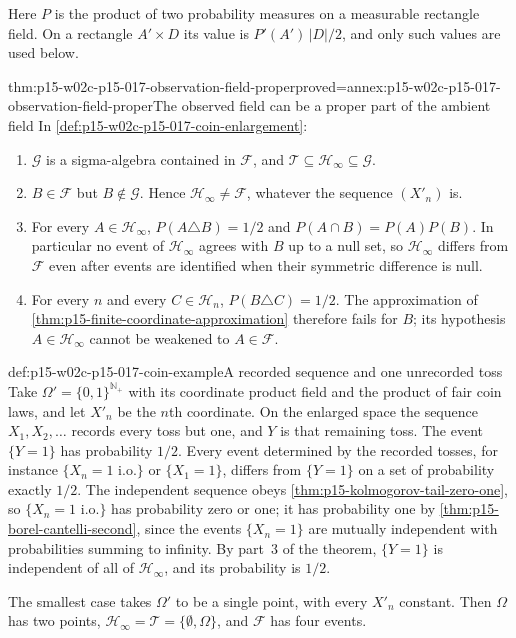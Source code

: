 Here \(P\) is the product of two probability measures on a measurable
rectangle field. On a rectangle \(A'\times D\) its value is
\(P'(A')\,|D|/2\), and only such values are used below.

\begin{hbtheorem}{thm:p15-w02c-p15-017-observation-field-proper}{proved=annex:p15-w02c-p15-017-observation-field-proper}{The observed field can be a proper part of the ambient field}
In \cref{def:p15-w02c-p15-017-coin-enlargement}:
\begin{enumerate}
\item \(\mathcal G\) is a sigma-algebra contained in \(\mathcal F\), and
\(\mathcal T\subseteq\mathcal H_\infty\subseteq\mathcal G\).
\item \(B\in\mathcal F\) but \(B\notin\mathcal G\). Hence
\(\mathcal H_\infty\neq\mathcal F\), whatever the sequence
\((X'_n)\) is.
\item For every \(A\in\mathcal H_\infty\),
\(P(A\triangle B)=1/2\) and \(P(A\cap B)=P(A)P(B)\).
In particular no event of \(\mathcal H_\infty\) agrees with \(B\)
up to a null set, so \(\mathcal H_\infty\) differs from \(\mathcal F\)
even after events are identified when their symmetric difference is null.
\item For every \(n\) and every \(C\in\mathcal H_n\),
\(P(B\triangle C)=1/2\). The approximation of
\cref{thm:p15-finite-coordinate-approximation} therefore fails for
\(B\); its hypothesis \(A\in\mathcal H_\infty\) cannot be weakened to
\(A\in\mathcal F\).
\end{enumerate}
\end{hbtheorem}

\begin{hbexample}{def:p15-w02c-p15-017-coin-example}{A recorded sequence and one unrecorded toss}
Take \(\Omega'=\{0,1\}^{\mathbb N_+}\) with its coordinate product field
and the product of fair coin laws, and let \(X'_n\) be the \(n\)th
coordinate. On the enlarged space the sequence \(X_1,X_2,\ldots\)
records every toss but one, and \(Y\) is that remaining toss. The event
\(\{Y=1\}\) has probability \(1/2\). Every event determined by the
recorded tosses, for instance \(\{X_n=1\text{ i.o.}\}\) or
\(\{X_1=1\}\), differs from \(\{Y=1\}\) on a set of probability exactly
\(1/2\). The independent sequence obeys
\cref{thm:p15-kolmogorov-tail-zero-one}, so \(\{X_n=1\text{ i.o.}\}\)
has probability zero or one; it has probability one by
\cref{thm:p15-borel-cantelli-second}, since the events
\(\{X_n=1\}\) are mutually independent with probabilities summing to
infinity. By part~3 of the theorem, \(\{Y=1\}\) is independent of all
of \(\mathcal H_\infty\), and its probability is \(1/2\).

The smallest case takes \(\Omega'\) to be a single point, with every
\(X'_n\) constant. Then \(\Omega\) has two points,
\(\mathcal H_\infty=\mathcal T=\{\emptyset,\Omega\}\), and
\(\mathcal F\) has four events.
\end{hbexample}

